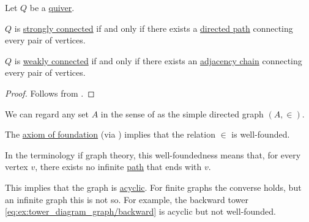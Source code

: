 \begin{proposition}\label{thm:quiver_connectedness_via_chains}
  Let \( Q \) be a \hyperref[def:graph/quiver]{quiver}.

  \begin{thmenum}
     \( Q \) is \hyperref[def:quiver_connectedness/strong]{strongly connected} if and only if there exists a \hyperref[def:quiver_directed_path]{directed path} connecting every pair of vertices.

     \( Q \) is \hyperref[def:quiver_connectedness/weak]{weakly connected} if and only if there exists an \hyperref[def:quiver_adjacency_chain]{adjacency chain} connecting every pair of vertices.
  \end{thmenum}
\end{proposition}
\begin{proof}
  Follows from .
\end{proof}

\begin{remark}\label{rem:well_founded_graphs}
  We can regard any set \( A \) in the sense of \hyperref[def:zfc]{} as the simple directed graph \( (A, \in) \).

  The \hyperref[def:zfc/foundation]{axiom of foundation} (via ) implies that the relation \( \in \) is well-founded.

  In the terminology if graph theory, this well-foundedness means that, for every vertex \( v \), there exists no infinite \hyperref[def:quiver_directed_path]{path} that ends with \( v \).

  This implies that the graph is \hyperref[def:quiver_cycle]{acyclic}. For finite graphs the converse holds, but an infinite graph this is not so. For example, the backward tower \eqref{eq:ex:tower_diagram_graph/backward} is acyclic but not well-founded.
\end{remark}


